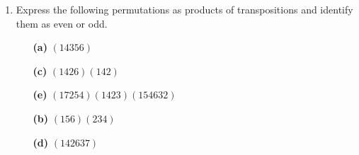{\begin{enumerate}
\begin{minipage}[t]{4.6in}
\begin{minipage}[t]{2.25in}
\begin{itemize}
 \item[{\bf (j)}]
$(1254)^{100}$
 
 \item[{\bf (l)}]
$|(1254)^2|$
 
 \item[{\bf (n)}]
$(12537)^{-1}$
 
 \item[{\bf (p)}]
$[(1235)(467)]^{-1}$
 
\end{itemize}
\end{minipage}
\end{minipage}
 
\vspace{2pt}        %
 
 
\bf \item \rm %
Express the following permutations as products of transpositions and
identify them as even or odd. 
 
 
\vspace{3pt}        %
 
\hspace{-7pt}
\begin{minipage}[t]{4.6in}
\noindent
\begin{minipage}[t]{2.25in}
\begin{itemize}
 
 \item[{\bf (a)}]
$(14356)$
 
 \item[{\bf (c)}]
$(1426)(142)$
 
 \item[{\bf (e)}]
$(17254)(1423)(154632)$
 
\end{itemize}
\end{minipage} \hfill
\begin{minipage}[t]{2.25in}
\begin{itemize}
 
 \item[{\bf (b)}]
$(156)(234)$
 
 \item[{\bf (d)}]
$(142637)$
 
\end{itemize}
\end{minipage}
\end{minipage}
 
\vspace{2pt}        %
 

\end{enumerate}}
